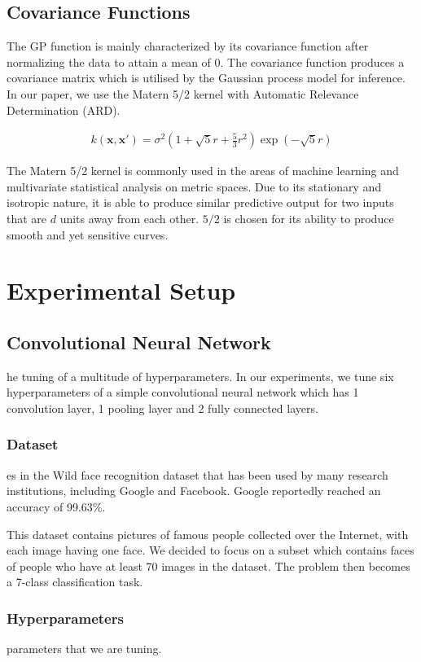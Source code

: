 \documentclass[letterpaper]{article}
\begin{document}
\subsection{Covariance Functions}
The GP function is mainly characterized by its covariance function after normalizing the data to attain a mean of 0. The covariance function produces a covariance matrix which is utilised by the Gaussian process model for inference.
In our paper, we use the Matern 5/2 kernel with Automatic Relevance Determination (ARD).

\begin{align*}
	k (\textbf{x},\textbf{x}') = \sigma^2(1+\sqrt5r+\frac{5}{3}r^2)\exp(-\sqrt5r)
\end{align*}

The Matern 5/2 kernel is commonly used in the areas of machine learning and multivariate statistical analysis on metric spaces. Due to its stationary and isotropic nature, it is able to produce similar predictive output for two inputs that are $d$ units away from each other. $5/2$ is chosen for its ability to produce smooth and yet sensitive curves.

\section{Experimental Setup}

\subsection{Convolutional Neural Network}
he tuning of a multitude of hyperparameters. In our experiments, we tune six hyperparameters of a simple convolutional neural network which has 1 convolution layer, 1 pooling layer and 2 fully connected layers.

\subsubsection{Dataset}
es in the Wild face recognition dataset that has been used by many research institutions, including Google and Facebook. Google reportedly reached an accuracy of 99.63\%.

This dataset contains pictures of famous people collected over the Internet, with each image having one face. We decided to focus on a subset which contains faces of people who have at least 70 images in the dataset. The problem then becomes a 7-class classification task.

\subsubsection{Hyperparameters}
parameters that we are tuning.
\end{document}
